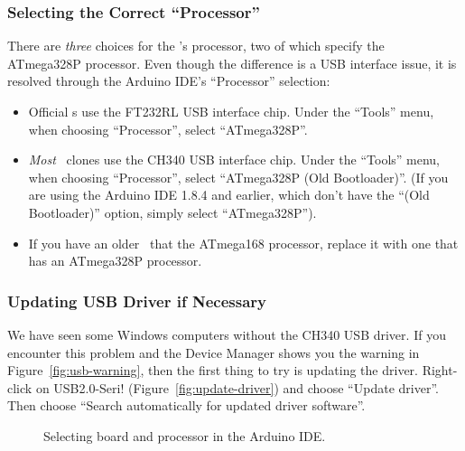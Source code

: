 \subsubsection{Selecting the Correct ``Processor''}\label{subsubsec:processor-selection}

There are \textit{three} choices for the \developmentboard{}'s processor, two of which specify the ATmega328P processor.
Even though the difference is a USB interface issue, it is resolved through the Arduino IDE's ``Processor'' selection:

\begin{itemize}
    \item Official \developmentboard{}s use the FT232RL USB interface chip.
    Under the ``Tools'' menu, when choosing ``Processor'', select ``ATmega328P''.
    \item \textit{Most} \developmentboard\ clones use the CH340 USB interface chip.
    Under the ``Tools'' menu, when choosing ``Processor'', select ``ATmega328P (Old Bootloader)''.
    (If you are using the Arduino IDE 1.8.4 and earlier, which don't have the ``(Old Bootloader)'' option, simply select ``ATmega328P'').
    \item If you have an older \developmentboard\ that the ATmega168 processor, replace it with one that has an ATmega328P processor.
\end{itemize}

\subsubsection{Updating USB Driver if Necessary}

We have seen some Windows computers without the CH340 USB driver.
If you encounter this problem and the Device Manager shows you the warning in Figure~\ref{fig:usb-warning}, then the first thing to try is updating the driver.
Right-click on USB2.0-Seri! (Figure~\ref{fig:update-driver}) and choose ``Update driver''.
Then choose ``Search automatically for updated driver software''.

\begin{figure}
    \centering
    \hfil
    \caption{Selecting board and processor in the Arduino IDE.}
\end{figure}

